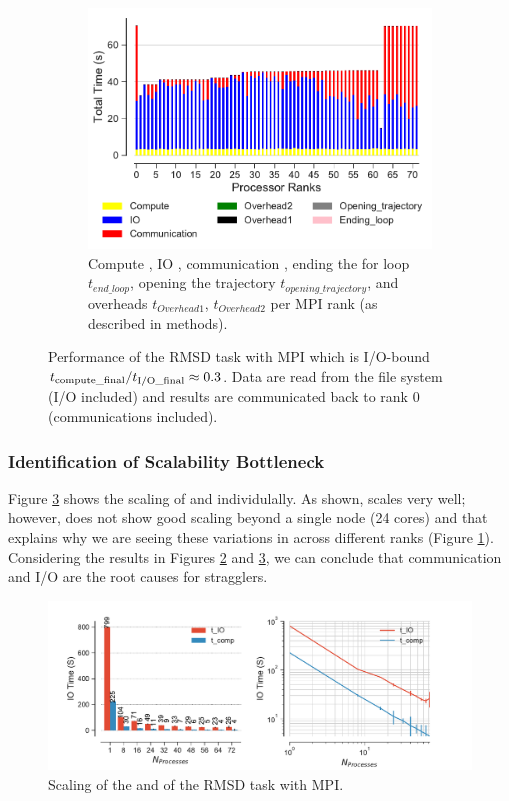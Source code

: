 \begin{figure}
\begin{subfigure} {.8\textwidth}
  \includegraphics[width=\linewidth]{figures/main-RMSD-BarPlot-rank-comparison_72_4.pdf}
  \caption{Compute \tcomp, IO \tIO, communication \tcomm , ending the for loop $t_{end\_loop}$,
  opening the trajectory $t_{opening\_trajectory}$, and overheads $t_{Overhead1}$,  $t_{Overhead2}$ per MPI rank (as described in methods).}
  \label{fig:MPIranks}
\end{subfigure}
%
\caption{Performance of the RMSD task with MPI which is I/O-bound ${t}_{\text{compute\_final}}/{t}_{\text{I/O\_final}} \approx 0.3$.
Data are read from the file system (I/O included) and results are communicated back to
  rank 0 (communications included).}
\label{fig:MPIwithIO}
\end{figure}

\subsubsection*{Identification of Scalability Bottleneck}

Figure \ref{fig:ScalingComputeIO} shows the scaling of \tcomp and \tIO individulally. 
As shown, \tcomp scales very well; however, \tIO does not show good scaling beyond a single node (24 cores) and that explains why we are seeing these variations in \tIO across different ranks (Figure \ref{fig:MPIranks}). 
Considering the results in Figures \ref{fig:MPIwithIO} and \ref{fig:ScalingComputeIO}, we can conclude that communication and I/O are the root causes for stragglers. 

\begin{figure}
\centering
  \includegraphics[width=\linewidth]{figures/main-RMSD-time_comp_IO_comparison.pdf}
\caption{Scaling of the \tcomp and \tIO of the RMSD task with MPI.}
\label{fig:ScalingComputeIO}
\end{figure}

